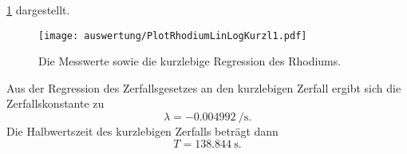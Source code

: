   \ref{fig:PlotRhodiumLinLogKurzl1} dargestellt.
  \begin{figure}[H]
    \centering
    \texttt{[image: auswertung/PlotRhodiumLinLogKurzl1.pdf]}
    \caption{Die Messwerte sowie die kurzlebige Regression des Rhodiums.}
    \label{fig:PlotRhodiumLinLogKurzl1}
  \end{figure}
  \noindent
  Aus der Regression des Zerfallsgesetzes an den kurzlebigen Zerfall ergibt sich die Zerfallskonstante zu
  \begin{equation*}
    \lambda = \SI{-0.004992}{\per\second}.%
  \end{equation*}
  Die Halbwertszeit des kurzlebigen Zerfalls beträgt dann
  \begin{equation*}
    T = \SI{138.844}{\second}.
  \end{equation*}
